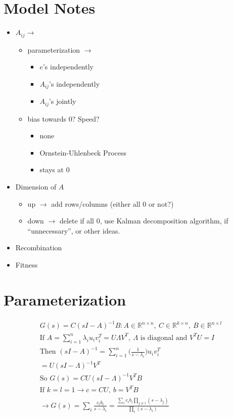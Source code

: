 \documentclass[a4paper, 11 pt]{article}
\begin{document}
  \section{Model Notes}
  \begin{itemize}
    \item $A_{ij} \rightarrow$
      \begin{itemize}
        \item parameterization $\rightarrow$
          \begin{itemize}
            \item $e$'s independently
            \item $A_{ij}$'s independently
            \item $A_{ij}$'s jointly
          \end{itemize}
        \item bias towards $0$? Speed?
          \begin{itemize}
            \item none
            \item Ornstein-Uhlenbeck Process
            \item stays at $0$
          \end{itemize}
      \end{itemize}
    \item Dimension of $A$
      \begin{itemize}
        \item up $\rightarrow$ add rows/columns (either all $0$ or not?)
        \item down $\rightarrow$ delete if all $0$, use Kalman decomposition algorithm, if ``unnecessary'', or other ideas.
      \end{itemize}
    \item Recombination
    \item Fitness
  \end{itemize}

  \section{Parameterization}
    \begin{equation}
      \begin{split}
        G(s) = C(sI-A)^{-1}B : A \in \mathbb{R}^{n \times n}, \ C \in \mathbb{R}^{k \times n}, \ B \in \mathbb{R}^{n \times l} \\
        \text{If } A = \sum^{n}_{i=1} \lambda_{i}u_{i}v_{i}^{T} = U \Lambda V^{T}, \ \Lambda \text{ is diagonal and } V^{T}U=I \\
        \text{Then } (sI-A)^{-1} = \sum_{i = 1}^{n} \big( \frac{ 1 }{ s-\lambda_{i} } \big) u_{i}v_{i}^{T} \\
        =U(sI-\Lambda)^{-1}V^{T} \\
        \text{So } G(s) = CU(sI-\Lambda)^{-1}V^{T}B \\
        \text{If } k=l=1 \rightarrow c=CU, \ b=V^{T}B \\
        \rightarrow G(s)=\sum_{i} \frac{ c_{i} b_{i} }{s-\lambda_{i}} = \frac{ \sum_{i} c_{i} b_{i} \prod_{j \neq i} (s-\lambda_{j}) }{ \prod_{i} (s-\lambda_{i}) }
      \end{split}
    \end{equation}
\end{document}
